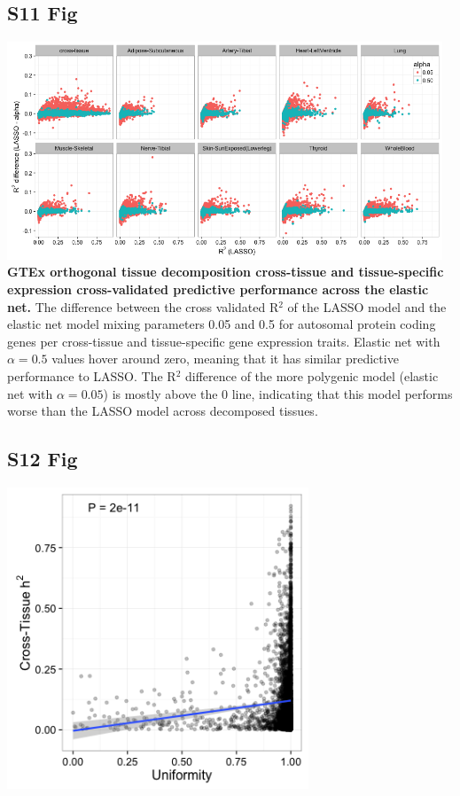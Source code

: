 \documentclass[10pt,letterpaper]{article}
\begin{document}
\begin{singlespace}
\subsection*{S11 Fig}
\includegraphics[width=13cm]{Figures/GenArch_Supp/S7Fig.png}
\label{S11_Fig}
{\bf GTEx orthogonal tissue decomposition cross-tissue and tissue-specific expression cross-validated predictive performance across the elastic net.} The difference between the cross validated R$^2$ of the LASSO model and the elastic net model mixing parameters 0.05 and 0.5 for autosomal protein coding genes per cross-tissue and tissue-specific gene expression traits. Elastic net with $\alpha=0.5$ values hover around zero, meaning that it has similar predictive performance to LASSO. The R$^2$ difference of the more polygenic model (elastic net with $\alpha=0.05$) is mostly above the 0 line, indicating that this model performs worse than the LASSO model across decomposed tissues.
\end{singlespace}
\pagebreak

\subsection*{S12 Fig}
\includegraphics[width=9cm]{Figures/Fig-CT-entropy-continuous-lm.png}
\label{S12_Fig}
\end{document}
